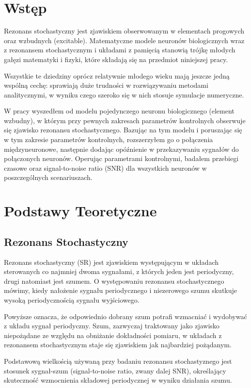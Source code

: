 \documentclass[12pt]{article}
\begin{document}
  \section{Wstęp}
  Rezonans stochastyczny jest zjawiskiem obserwowanym w elementach progowych oraz wzbudnych (excitable). Matematyczne modele neuronów biologicznych wraz z rezonansem stochastycznym i układami z pamięcią stanowią trójkę młodych gałęzi matematyki i fizyki, które składają się na przedmiot niniejszej pracy.
  
  Wszystkie te dziedziny oprócz relatywnie młodego wieku mają jeszcze jedną wspólną cechę: sprawiają duże trudności w rozwiązywaniu metodami analitycznymi, w wyniku czego szeroko się w nich stosuje symulacje numeryczne.
  
  W pracy wyszedłem od modelu pojedynczego neuronu biologicznego (element wzbudny), w którym przy pewnych zakresach parametrów kontrolnych obserwuje się zjawisko rezonansu stochastycznego. Bazując na tym modelu i poruszając się w tym zakresie parametrów kontrolnych, rozszerzyłem go o połączenia międzyneuronowe, następnie dodając opóźnienie w przekazywaniu sygnałów do połączonych neuronów. Operując parametrami kontrolnymi, badałem przebiegi czasowe oraz signal-to-noise ratio (SNR) dla wszystkich neuronów w poszczególnych scenariuszach. 
  
  
  \section{Podstawy Teoretyczne}
  
  \subsection{Rezonans Stochastyczny}
  
  Rezonans stochastyczny (SR) jest zjawiskiem występującym w układach sterowanych co najmniej dwoma sygnałami, z których jeden jest periodyczny, drugi natomiast jest szumem. O występowaniu rezonansu stochastycznego mówimy, kiedy nałożenie sygnału periodycznego i niezerowego szumu skutkuje wysoką periodycznością sygnału wyjściowego.
  
  Powyższe oznacza, że odpowiednio dobrany szum potrafi wzmacniać i wydobywać z układu sygnał periodyczny. Szum, zazwyczaj traktowany jako zjawisko niepożądane ze względu na obniżanie dokładności pomiaru, w układach z rezonansem stochastycznym staje się zjawiskiem jak najbardziej pożądanym. 
  
  Podstawową wielkością używaną przy badaniu rezonansu stochastyznego jest stosunek sygnał-szum (signal-to-noise ratio, zwany dalej SNR), określający skuteczność wzmocnienia składowej periodycznej w wyniku działania szumu.
  
\end{document}
